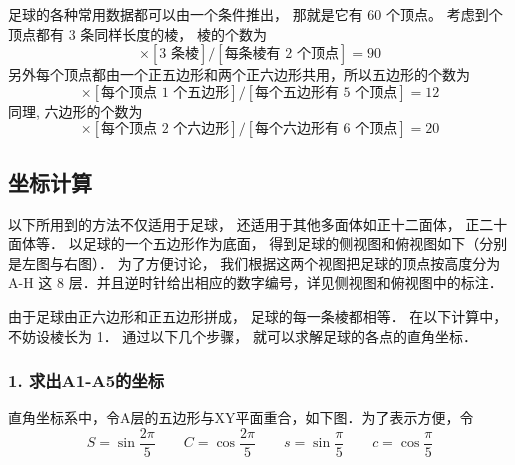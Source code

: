 

足球的各种常用数据都可以由一个条件推出， 那就是它有 60 个顶点。 考虑到个顶点都有 3 条同样长度的棱， 棱的个数为
\begin{equation}
[\text{60 顶点}] \times [\text{3 条棱}] / [\text{每条棱有 2 个顶点}] = 90
\end{equation}
另外每个顶点都由一个正五边形和两个正六边形共用，所以五边形的个数为
\begin{equation}
[\text{60 顶点}] \times [\text{每个顶点 1 个五边形}] / [\text{每个五边形有 5 个顶点}] = 12
\end{equation}
同理, 六边形的个数为
\begin{equation}
[\text{60 顶点}] \times [\text{每个顶点 2 个六边形}] / [\text{每个六边形有 6 个顶点}] = 20
\end{equation}

\subsection{坐标计算}
以下所用到的方法不仅适用于足球， 还适用于其他多面体如正十二面体， 正二十面体等． 以足球的一个五边形作为底面， 得到足球的侧视图和俯视图如下（分别是左图与右图）． 为了方便讨论， 我们根据这两个视图把足球的顶点按高度分为 A-H 这 8 层．并且逆时针给出相应的数字编号，详见侧视图和俯视图中的标注．

由于足球由正六边形和正五边形拼成， 足球的每一条棱都相等． 在以下计算中， 不妨设棱长为 1． 通过以下几个步骤， 就可以求解足球的各点的直角坐标．

\subsubsection{1. 求出A1-A5的坐标}
直角坐标系中，令A层的五边形与XY平面重合，如下图．为了表示方便，令
\begin{equation}
S = \sin\frac{2\pi}{5} \qquad
C = \cos\frac{2\pi}{5} \qquad
s = \sin\frac{\pi}{5} \qquad
c = \cos\frac{\pi}{5}
\end{equation}
